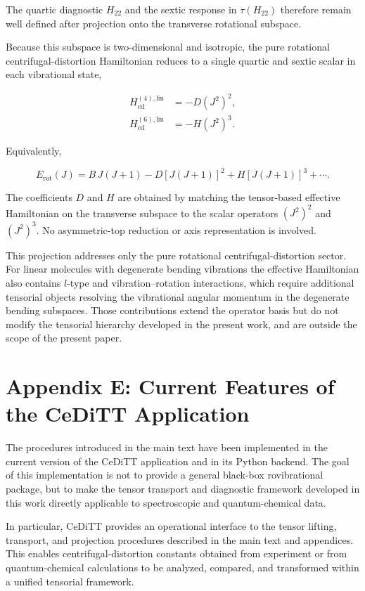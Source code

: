 \documentclass[aip,jcp,reprint,floatfix]{revtex4-2}
\begin{document}
The quartic diagnostic $H_{22}$ and the sextic response in
$\tau(H_{22})$ therefore remain well defined after projection onto the
transverse rotational subspace.

Because this subspace is two-dimensional and isotropic, the pure
rotational centrifugal-distortion Hamiltonian reduces to a single
quartic and sextic scalar in each vibrational state,

\begin{align}
H_{\mathrm{cd}}^{(4),\mathrm{lin}} &= -D(J^2)^2, \\
H_{\mathrm{cd}}^{(6),\mathrm{lin}} &= -H(J^2)^3 .
\end{align}

Equivalently,

\begin{equation}
E_{\mathrm{rot}}(J)
=
B\,J(J+1)
-D[J(J+1)]^2
+H[J(J+1)]^3+\cdots .
\end{equation}

The coefficients $D$ and $H$ are obtained by matching the tensor-based
effective Hamiltonian on the transverse subspace to the scalar
operators $(J^2)^2$ and $(J^2)^3$. No asymmetric-top reduction or axis
representation is involved.\cite{Aliev1986,Herzberg1945,AmatNielsenTarrago1971}

This projection addresses only the pure rotational centrifugal-distortion
sector. For linear molecules with degenerate bending vibrations the
effective Hamiltonian also contains $l$-type and vibration–rotation
interactions, which require additional tensorial objects resolving the
vibrational angular momentum in the degenerate bending subspaces.
Those contributions extend the operator basis but do not modify
the tensorial hierarchy developed in the present work, and are outside
the scope of the present paper.


\section{Appendix E: Current Features of the CeDiTT Application}

The procedures introduced in the main text have been implemented in
the current version of the CeDiTT application and in its Python
backend. The goal of this implementation is not to provide a general
black-box rovibrational package, but to make the tensor transport and
diagnostic framework developed in this work directly applicable to
spectroscopic and quantum-chemical data.

In particular, CeDiTT provides an operational interface to the
tensor lifting, transport, and projection procedures described in
the main text and appendices. This enables centrifugal-distortion
constants obtained from experiment or from quantum-chemical
calculations to be analyzed, compared, and transformed within a
unified tensorial framework.
\end{document}
